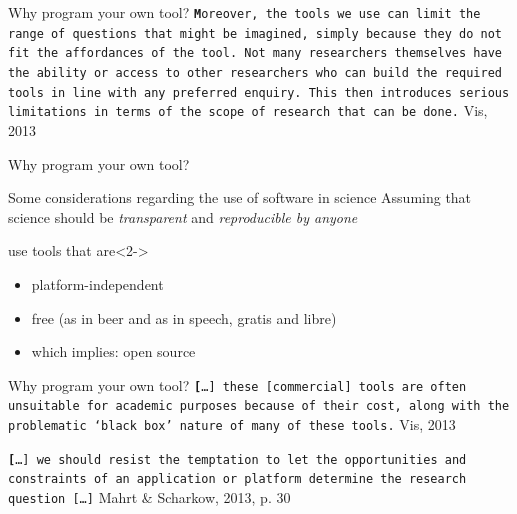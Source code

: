 \begin{frame}{Why program your own tool?}
\vspace{1cm}
{\tt \textbf
Moreover, the tools we use can limit the range of questions that might be imagined, simply because they do not fit the affordances of the tool. Not many researchers themselves have the ability or access to other researchers who can build the required tools in line with any preferred enquiry. This then introduces serious limitations in terms of the scope of research that can be done.}
\vspace{1cm}
\footnotesize{Vis, 2013\\}

\end{frame}


\begin{frame}{Why program your own tool?}
\end{frame}

\begin{frame}{Some considerations regarding the use of software in science}
Assuming that science should be \emph{transparent} and \emph{reproducible by anyone}
\begin{block}{use tools that are}<2->
\begin{itemize}
\item platform-independent 
\item free (as in beer and as in speech, gratis and libre)
\item which implies: open source
\end{itemize}
\end{block}
\end{frame}

\begin{frame}{Why program your own tool?}
\vspace{1cm}
{\tt \textbf
{[}\ldots{]} these {[}commercial{]} tools are often unsuitable for academic purposes because of their cost, along with the problematic ‘black box’ nature of many of these tools.}
{\footnotesize{Vis, 2013\\}}
\vspace{1cm}

{\tt \textbf
{[}\ldots{]} we should resist the temptation to let the opportunities and constraints of an application or platform determine the research question {[}\ldots{]}}
{\footnotesize{Mahrt \& Scharkow, 2013, p. 30\\}}

\end{frame}

